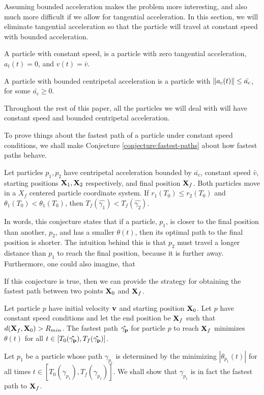 Assuming bounded acceleration makes the problem more interesting, and also much more difficult if we allow for tangential acceleration. In this section, we will eliminate tangential acceleration so that the particle will travel at constant speed with bounded acceleration.

\begin{definition}
  A particle with constant speed, is a particle with zero tangential acceleration, $a_t(t) = 0$, and $v(t) = \bar{v}$.
\end{definition}

\begin{definition}
  A particle with bounded centripetal acceleration is a particle with $\norm{a_c(t)} \le \bar{a_c}$, for some $\bar{a_c} \ge 0$.
\end{definition}

Throughout the rest of this paper, all the particles we will deal with will have constant speed and bounded centripetal acceleration.

To prove things about the fastest path of a particle under constant speed conditions, we shall make Conjecture \ref{conjecture:fastest-paths} about how fastest paths behave.

\begin{conjecture}
  \label{conjecture:fastest-paths}
  Let particles $p_1, p_2$ have centripetal acceleration bounded by $\bar{a_c}$, constant speed $\bar{v}$, starting positions $\mathbf{X}_1, \mathbf{X}_2$ respectively, and final position $\mathbf{X}_f$. Both particles move in a $X_f$ centered particle coordinate system. If $r_1(T_0) \leq r_2(T_0)$ and $\theta_1(T_0) < \theta_1(T_0)$, then $T_f(\hat{\gamma_1}) < T_f(\hat{\gamma_2})$.
\end{conjecture}

In words, this conjecture states that if a particle, $p_1$, is closer to the final position than another, $p_2$, and has a smaller $\theta(t)$, then its optimal path to the final position is shorter. The intuition behind this is that $p_2$ must travel a longer distance than $p_1$ to reach the final position, because it is further away. Furthermore, one could also imagine, that 

If this conjecture is true, then we can provide the strategy for obtaining the fastest path between two points $\mathbf{X}_0$ and $\mathbf{X}_f$.

\begin{theorem}
  Let particle $p$ have initial velocity $\mathbf{v}$ and starting position $\mathbf{X}_0$. Let $p$ have constant speed conditions and let the end position be $\mathbf{X}_f$ such that $d(\mathbf{X}_f, \mathbf{X}_0) > R_{min}$. The fastest path $\mathbf{\hat{\gamma_p}}$ for particle $p$ to reach $\mathbf{X}_f$ minimizes $\theta(t)$ for all $t \in [T_0(\mathbf{\hat{\gamma_p}}), T_f(\mathbf{\hat{\gamma_p}})]$.
  \label{thm:restricted-theta}
\end{theorem}
\proof Let $p_1$ be a particle whose path $\gamma_{p_1}$ is determined by the minimizing $|\theta_{p_1}(t)|$ for all times $t \in [T_0(\gamma_{p_1}), T_f(\gamma_{p_1})]$. We shall show that $\gamma_{p_1}$ is in fact the fastest path to $\mathbf{X}_f$.

